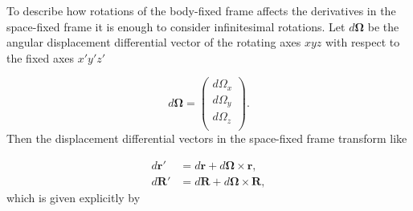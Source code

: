 To describe how rotations of the body-fixed frame affects the derivatives in the space-fixed frame it is enough to consider infinitesimal rotations.  Let $d\mathbf{\Omega}$ be the angular displacement differential vector of the rotating axes $xyz$ with respect to the fixed axes $x'y'z'$

\begin{equation}
d\mathbf{\Omega} =
\begin{pmatrix}
d\Omega_x\\
d\Omega_y\\
d\Omega_z\\
\end{pmatrix}.
\end{equation}
Then the displacement differential vectors in the space-fixed frame transform like


\begin{subequations}
	\begin{align}
	d{\mathbf{r}}' &= d\mathbf{r} + d\mathbf{\Omega} \times \mathbf{r},\\
	d{\mathbf{R}}' &= d\mathbf{R} + d\mathbf{\Omega} \times \mathbf{R},
	\end{align}
\end{subequations}   
which is given explicitly by

